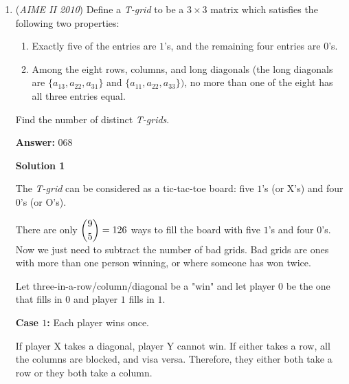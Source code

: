 \begin{enumerate}
 No! We forgot to check for when $p = q$. You might say, "Pinotation, 2010 is squarefree!". However, if $p = q = 1, -1$, then such a solution $a = 2010$ still exists. These two orbits are unaffected under rotation, meaning we have to subtract it from the 324 ordered pairs, so we have $\frac{324-2}{2} + 2$ cases, or $161 + 2 = \boxed{163}$ plausible polynomials.

 This example of "unaffecting via rotation" is an example of a repeated (double) root, which is an example of a fixed orbit via Burnsides Lemma.

 


	\item (\textit{AIME II 2010}) Define a \textit{T-grid} to be a $3\times3$ matrix which satisfies the following two properties:


 
            \begin{enumerate}

        \item Exactly five of the entries are $1$'s, and the remaining four entries are $0$'s.

        \item Among the eight rows, columns, and long diagonals (the long diagonals are $\{a_{13},a_{22},a_{31}\}$ and $\{a_{11},a_{22},a_{33}\})$, no more than one of the eight has all three entries equal.
            \end{enumerate}
            Find the number of distinct \textit{T-grids}.


 
 \textbf{Answer: }068



\textbf{Solution 1}

The \textit{T-grid} can be considered as a tic-tac-toe board: five $1$'s (or X's) and four $0$'s (or O's). 

 There are only $\dbinom{9}{5} = 126$  ways to fill the board with five $1$'s and four $0$'s. Now we just need to subtract the number of bad grids. Bad grids are ones with more than one person winning, or where someone has won twice.

 Let three-in-a-row/column/diagonal be a "win" and let player $0$ be the one that fills in $0$ and player $1$ fills in $1$.

 \textbf{Case $1$:} Each player wins once. 

 If player X takes a diagonal, player Y cannot win. If either takes a row, all the columns are blocked, and visa versa. Therefore, they either both take a row or they both take a column.


\end{enumerate}
